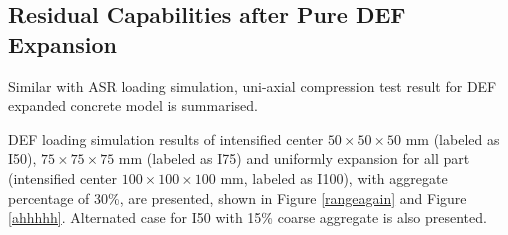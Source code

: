 \clearpage

\subsection{Residual Capabilities after Pure DEF Expansion}

Similar with ASR loading simulation, uni-axial compression test result for DEF expanded concrete model is summarised.

DEF loading simulation results of intensified center $50 \times 50 \times 50$ mm (labeled as I50), $75 \times 75 \times 75$ mm (labeled as I75) and uniformly expansion for all part (intensified center $100 \times 100 \times 100$ mm, labeled as I100), with aggregate percentage of 30\%, are presented, shown in Figure \ref{rangeagain} and Figure \ref{ahhhhh}. Alternated case for I50 with 15\% coarse aggregate is also presented.

